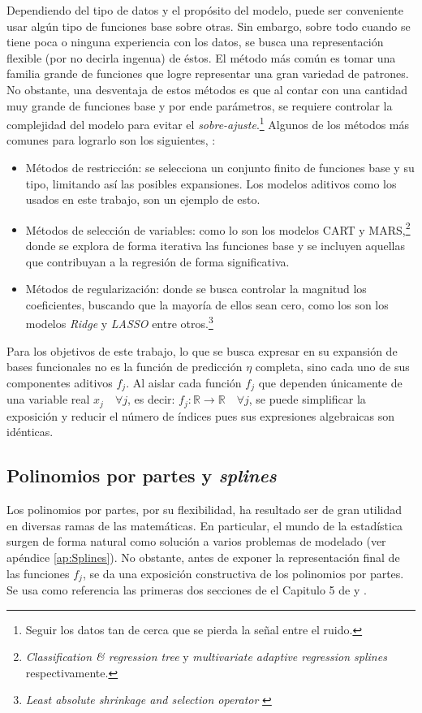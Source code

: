 \documentclass[../Main/Main.tex]{subfiles}
\begin{document}
Dependiendo del tipo de datos y el propósito del modelo, puede ser conveniente usar algún tipo de funciones base sobre otras. Sin embargo, sobre todo cuando se tiene poca o ninguna experiencia con los datos, se busca una representación flexible (por no decirla ingenua) de éstos. El método más común es tomar una familia grande de funciones que logre representar una gran variedad de patrones. No obstante, una desventaja de estos métodos es que al contar con una cantidad muy grande de funciones base y por ende parámetros, se requiere controlar la complejidad del modelo para evitar el \textit{sobre-ajuste}.\footnote{Seguir los datos tan de cerca que se pierda la señal entre el ruido.} Algunos de los métodos más comunes para lograrlo son los siguientes, \citet{hastie2008elements}:
\begin{itemize}[label={}]
	\item Métodos de restricción: se selecciona un conjunto finito de funciones base y su tipo, limitando así las posibles expansiones. Los modelos aditivos como los usados en este trabajo, son un ejemplo de esto.  
	\item Métodos de selección de variables: como lo son los modelos CART y MARS,\footnote{\textit{Classification \& regression tree} \autocite{breiman1984classification} y \textit{multivariate adaptive regression splines} \autocite{friedman1991multivariate} respectivamente.} donde se explora de forma iterativa las funciones base y se incluyen aquellas que contribuyan a la regresión de forma significativa.
	\item Métodos de regularización: donde se busca controlar la magnitud los coeficientes, buscando que la mayoría de ellos sean cero, como los son los modelos \textit{Ridge} y  \textit{LASSO} entre otros.\footnote{\textit{Least absolute shrinkage and selection operator} \autocite{hoerl1970ridge, tibshirani1996regression}}
\end{itemize}

Para los objetivos de este trabajo, lo que se busca expresar en su expansión de bases funcionales no es la función de predicción $\eta$ completa, sino cada uno de sus componentes aditivos $f_j$. Al aislar cada función $f_j$ que dependen únicamente de una variable real $x_j \quad \forall j$, es decir: $f_j:\mathbb{R}\rightarrow\mathbb{R} \quad \forall j$, se puede simplificar la exposición y reducir el número de índices pues sus expresiones algebraicas son idénticas.

\subsection{Polinomios por partes y \textit{splines}} \label{sec:PolisYSplines}
Los polinomios por partes, por su flexibilidad, ha resultado ser de gran utilidad en diversas ramas de las matemáticas. En particular, el mundo de la estadística surgen de forma natural como solución a varios problemas de modelado (ver apéndice \ref{ap:Splines}). No obstante, antes de exponer la representación final de las funciones $f_j$, se da una exposición constructiva de los polinomios por partes. Se usa como referencia las primeras dos secciones de el Capitulo 5 de \citet{hastie2008elements} y \citet{wahba1990splines}. 
\end{document}
